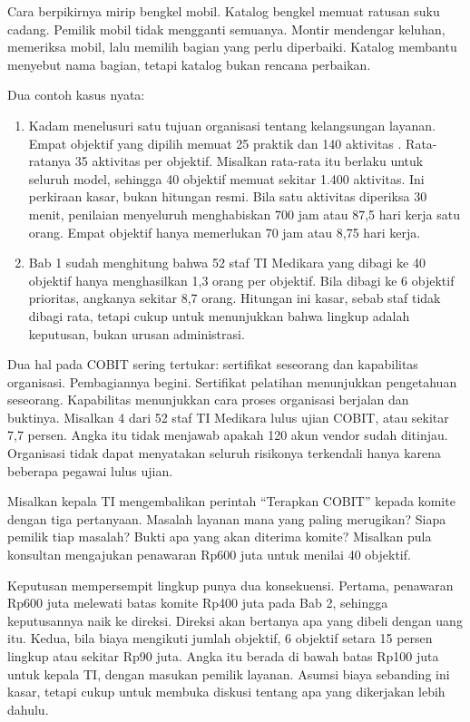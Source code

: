 Cara berpikirnya mirip bengkel mobil. Katalog bengkel memuat ratusan suku cadang. Pemilik mobil
tidak mengganti semuanya. Montir mendengar keluhan, memeriksa mobil, lalu memilih bagian yang
perlu diperbaiki. Katalog membantu menyebut nama bagian, tetapi katalog bukan rencana perbaikan.

Dua contoh kasus nyata:
\begin{enumerate}
  \item Kadam menelusuri satu tujuan organisasi tentang kelangsungan layanan. Empat objektif
  yang dipilih memuat 25 praktik dan 140 aktivitas \cite{c04-kontinuitas}. Rata-ratanya 35
  aktivitas per objektif. Misalkan rata-rata itu berlaku untuk seluruh model, sehingga 40
  objektif memuat sekitar 1.400 aktivitas. Ini perkiraan kasar, bukan hitungan resmi. Bila satu
  aktivitas diperiksa 30 menit, penilaian menyeluruh menghabiskan 700 jam atau 87,5 hari kerja
  satu orang. Empat objektif hanya memerlukan 70 jam atau 8,75 hari kerja.
  \item Bab 1 sudah menghitung bahwa 52 staf TI Medikara yang dibagi ke 40 objektif hanya
  menghasilkan 1,3 orang per objektif. Bila dibagi ke 6 objektif prioritas, angkanya sekitar 8,7
  orang. Hitungan ini kasar, sebab staf tidak dibagi rata, tetapi cukup untuk menunjukkan bahwa
  lingkup adalah keputusan, bukan urusan administrasi.
\end{enumerate}

Dua hal pada COBIT sering tertukar: sertifikat seseorang dan kapabilitas organisasi. Pembagiannya
begini. Sertifikat pelatihan menunjukkan pengetahuan seseorang. Kapabilitas menunjukkan cara
proses organisasi berjalan dan buktinya. Misalkan 4 dari 52 staf TI Medikara lulus ujian COBIT,
atau sekitar 7,7 persen. Angka itu tidak menjawab apakah 120 akun vendor sudah ditinjau. Organisasi
tidak dapat menyatakan seluruh risikonya terkendali hanya karena beberapa pegawai lulus ujian.

\begin{kasus}[title={Kasus Medikara Health: Dari Perintah ke Tiga Pertanyaan}]
Misalkan kepala TI mengembalikan perintah ``Terapkan COBIT'' kepada komite dengan tiga pertanyaan.
Masalah layanan mana yang paling merugikan? Siapa pemilik tiap masalah? Bukti apa yang akan diterima
komite? Misalkan pula konsultan mengajukan penawaran Rp600 juta untuk menilai 40 objektif.

Keputusan mempersempit lingkup punya dua konsekuensi. Pertama, penawaran Rp600 juta melewati batas
komite Rp400 juta pada Bab 2, sehingga keputusannya naik ke direksi. Direksi akan bertanya apa yang
dibeli dengan uang itu. Kedua, bila biaya mengikuti jumlah objektif, 6 objektif setara 15 persen
lingkup atau sekitar Rp90 juta. Angka itu berada di bawah batas Rp100 juta untuk kepala TI, dengan
masukan pemilik layanan. Asumsi biaya sebanding ini kasar, tetapi cukup untuk membuka diskusi tentang
apa yang dikerjakan lebih dahulu.
\end{kasus}

